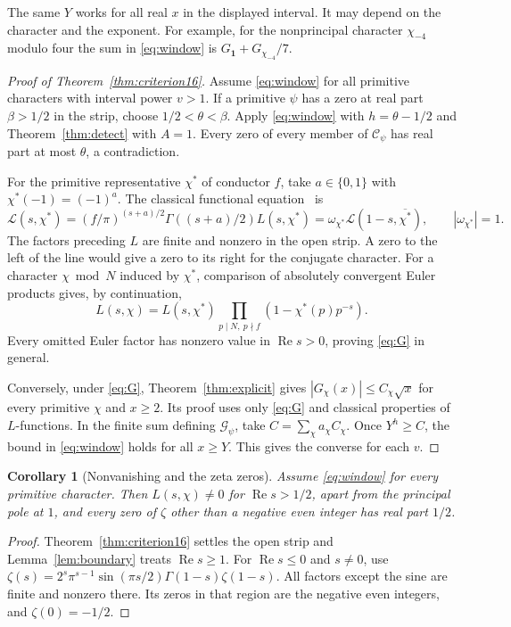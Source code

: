 \documentclass[a4paper,11pt]{article}
\newtheorem{corollary}[proposition]{Corollary}
\theoremstyle{definition}
\theoremstyle{remark}
\newcommand{\Lh}{\mathcal L}\newcommand{\Gg}{\mathcal G}
\newcommand{\real}{\operatorname{Re}}\newcommand{\imag}{\operatorname{Im}}
\numberwithin{equation}{section}
\begin{document}
The same \(Y\) works for all real \(x\) in the displayed interval. It may depend on the character and the exponent. For example, for the nonprincipal character \(\chi_{-4}\) modulo four the sum in \eqref{eq:window} is \(G_{\mathbf1}+G_{\chi_{-4}}/7\).

\begin{proof}[Proof of Theorem~\ref{thm:criterion16}]
Assume \eqref{eq:window} for all primitive characters with interval power \(v>1\). If a primitive \(\psi\) has a zero at real part \(\beta>1/2\) in the strip, choose \(1/2<\theta<\beta\). Apply \eqref{eq:window} with \(h=\theta-1/2\) and Theorem~\ref{thm:detect} with \(A=1\). Every zero of every member of \(\mathcal C_\psi\) has real part at most \(\theta\), a contradiction.

For the primitive representative \(\chi^*\) of conductor \(f\), take \(a\in\{0,1\}\) with \(\chi^*(-1)=(-1)^a\). The classical functional equation~\cite{I-I-I-nist,I-I-I-elkies} is
\[
 \Lh(s,\chi^*)=(f/\pi)^{(s+a)/2}\Gamma((s+a)/2)L(s,\chi^*)
              =\omega_{\chi^*}\Lh(1-s,\overline{\chi^*}),
 \qquad |\omega_{\chi^*}|=1.
\]
The factors preceding \(L\) are finite and nonzero in the open strip. A zero to the left of the line would give a zero to its right for the conjugate character. For a character \(\chi\bmod N\) induced by \(\chi^*\), comparison of absolutely convergent Euler products gives, by continuation,
\[
 L(s,\chi)=L(s,\chi^*)\prod_{p\mid N,\ p\nmid f}(1-\chi^*(p)p^{-s}).
\]
Every omitted Euler factor has nonzero value in \(\real s>0\), proving \eqref{eq:G} in general.

Conversely, under \eqref{eq:G}, Theorem~\ref{thm:explicit} gives \(|G_\chi(x)|\le C_\chi\sqrt x\) for every primitive \(\chi\) and \(x\ge2\). Its proof uses only \eqref{eq:G} and classical properties of \(L\)-functions. In the finite sum defining \(\Gg_\psi\), take \(C=\sum_\chi a_\chi C_\chi\). Once \(Y^h\ge C\), the bound in \eqref{eq:window} holds for all \(x\ge Y\). This gives the converse for each \(v\).
\end{proof}
\begin{corollary}[Nonvanishing and the zeta zeros]
Assume \eqref{eq:window} for every primitive character. Then \(L(s,\chi)\ne0\) for \(\real s>1/2\), apart from the principal pole at \(1\), and every zero of \(\zeta\) other than a negative even integer has real part \(1/2\).
\end{corollary}
\begin{proof}
Theorem~\ref{thm:criterion16} settles the open strip and Lemma~\ref{lem:boundary} treats \(\real s\ge1\). For \(\real s\le0\) and \(s\ne0\), use
\(\zeta(s)=2^s\pi^{s-1}\sin(\pi s/2)\Gamma(1-s)\zeta(1-s)\).
All factors except the sine are finite and nonzero there. Its zeros in that region are the negative even integers, and \(\zeta(0)=-1/2\).
\end{proof}
\end{document}
